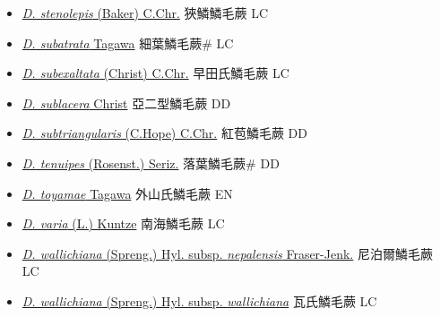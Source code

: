 \begin{itemize}
\begin{itemize}
        \item[] \href{http://www.theplantlist.org/tpl1.1/search?q=Dryopteris+stenolepis}{\textit{D. stenolepis} (Baker) C.Chr.}   狹鱗鱗毛蕨 LC
        \item[] \href{http://www.theplantlist.org/tpl1.1/search?q=Dryopteris+subatrata}{\textit{D. subatrata} Tagawa}   細葉鱗毛蕨\# LC
        \item[] \href{http://www.theplantlist.org/tpl1.1/search?q=Dryopteris+subexaltata}{\textit{D. subexaltata} (Christ) C.Chr.}   早田氏鱗毛蕨 LC
        \item[] \href{http://www.theplantlist.org/tpl1.1/search?q=Dryopteris+sublacera}{\textit{D. sublacera} Christ}   亞二型鱗毛蕨 DD
        \item[] \href{http://www.theplantlist.org/tpl1.1/search?q=Dryopteris+subtriangularis}{\textit{D. subtriangularis} (C.Hope) C.Chr.}   紅苞鱗毛蕨 DD
        \item[] \href{http://www.theplantlist.org/tpl1.1/search?q=Dryopteris+tenuipes}{\textit{D. tenuipes} (Rosenst.) Seriz.}   落葉鱗毛蕨\# DD
        \item[] \href{http://www.theplantlist.org/tpl1.1/search?q=Dryopteris+toyamae}{\textit{D. toyamae} Tagawa}   外山氏鱗毛蕨 EN
        \item[] \href{http://www.theplantlist.org/tpl1.1/search?q=Dryopteris+varia}{\textit{D. varia} (L.) Kuntze}   南海鱗毛蕨 LC
        \item[] \href{http://www.theplantlist.org/tpl1.1/search?q=Dryopteris+wallichiana+subsp.+nepalensis}{\textit{D. wallichiana} (Spreng.) Hyl. subsp. \textit{nepalensis} Fraser-Jenk.}   尼泊爾鱗毛蕨 LC
        \item[] \href{http://www.theplantlist.org/tpl1.1/search?q=Dryopteris+wallichiana+subsp.+wallichiana}{\textit{D. wallichiana} (Spreng.) Hyl. subsp. \textit{wallichiana}}   瓦氏鱗毛蕨 LC

\end{itemize}
\end{itemize}
